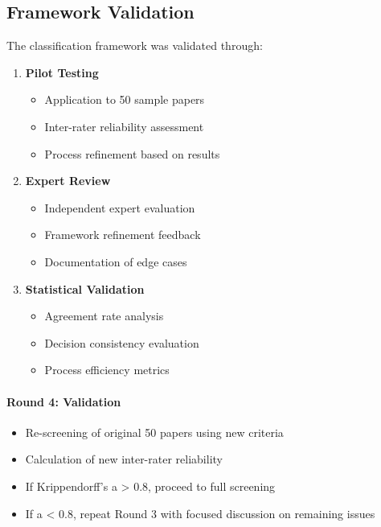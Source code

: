 \documentclass[a4paper,12pt]{article}
\begin{document}
\begin{enumerate}
\subsection{Framework Validation}
The classification framework was validated through:

\begin{enumerate}
    \item \textbf{Pilot Testing}
    \begin{itemize}
        \item Application to 50 sample papers
        \item Inter-rater reliability assessment
        \item Process refinement based on results
    \end{itemize}

    \item \textbf{Expert Review}
    \begin{itemize}
        \item Independent expert evaluation
        \item Framework refinement feedback
        \item Documentation of edge cases
    \end{itemize}

    \item \textbf{Statistical Validation}
    \begin{itemize}
        \item Agreement rate analysis
        \item Decision consistency evaluation
        \item Process efficiency metrics
    \end{itemize}
\end{enumerate}





    \paragraph{Round 4: Validation}
    \begin{itemize}
        \item Re-screening of original 50 papers using new criteria
        \item Calculation of new inter-rater reliability
        \item If Krippendorff's a > 0.8, proceed to full screening
        \item If a < 0.8, repeat Round 3 with focused discussion on remaining issues
    \end{itemize}
\end{enumerate}
\end{document}
